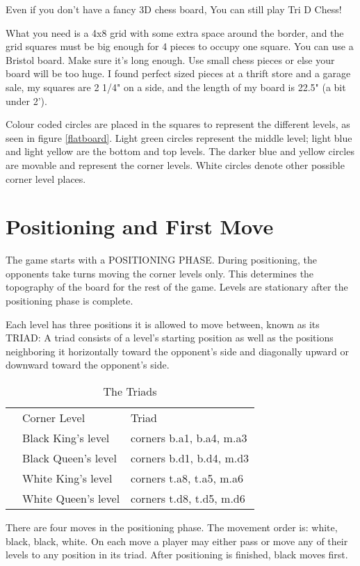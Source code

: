 \documentclass[12pt]{article} %
\begin{document}
Even if you don't have a fancy 3D chess board, You can still play Tri D Chess!

What you need is a 4x8 grid with some extra space around the border, and the grid squares must be big enough for 4 pieces to occupy one square.  You can use a Bristol board.  Make sure it's long enough.  Use small chess pieces or else your board will be too huge.  I found perfect sized pieces at a thrift store and a garage sale, my squares are 2 1/4" on a side, and the length of my board is 22.5" (a bit under 2').  

Colour coded circles are placed in the squares to represent the different levels, as seen in figure \ref{flatboard}.  Light green circles represent the middle level; light blue and light yellow are the bottom and top levels.  The darker blue and yellow circles are movable and represent the corner levels.  White circles denote other possible corner level places.

\section{Positioning and First Move}

The game starts with a POSITIONING PHASE.  During positioning, the opponents take turns moving the corner levels only.  This determines the topography of the board for the rest of the game.  Levels are stationary after the positioning phase is complete.  

Each level has three positions it is allowed to move between, known as its TRIAD: A triad consists of a level's starting position as well as the positions neighboring it horizontally toward the opponent's side and diagonally upward or downward toward the opponent's side.

\begin{table}[H]
\caption{The Triads}
\label{triads}
\begin{tabular}{lll}
 & Corner Level & Triad \\
 & Black King's level & corners b.a1, b.a4, m.a3 \\
 & Black Queen's level & corners b.d1, b.d4, m.d3 \\
 & White King's level & corners t.a8, t.a5, m.a6 \\
 & White Queen's level & corners t.d8, t.d5, m.d6 
\end{tabular}
\end{table}

There are four moves in the positioning phase.  The movement order is:
white, 
black,
black,
white.
On each move a player may either pass or move any of their levels to any position in its triad. After positioning is finished, black moves first.
\end{document}
